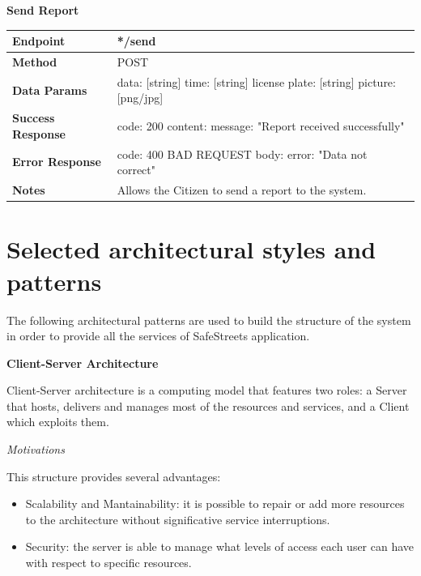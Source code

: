 \documentclass{report}
\begin{document}
\begin{center}{\textbf{Send Report}}\end{center}
    \begin{tabular}{| l | p{8cm} |}
        \hline
        \textbf{Endpoint} & */send \\
        \hline
        \textbf{Method} & POST \\
        \hline
        \textbf{Data Params} & data: [string] \newline time: [string] \newline license plate: [string] \newline picture: [png/jpg]\\
        \hline
        \textbf{Success Response} & code: 200 \newline content: {message: "Report received successfully"}\\
        \hline
        \textbf{Error Response} & code: 400 BAD REQUEST \newline body: {error: "Data not correct"}\\
        \hline
        \textbf{Notes} & Allows the Citizen to send a report to the system. \\
        \hline
    \end{tabular}


\section{Selected architectural	styles and patterns}
The following architectural patterns are used to build the structure of the system in order to provide all the services of SafeStreets application.\\

\begin{center}\large{\textbf{Client-Server Architecture}}\end{center}
Client-Server architecture is a computing model that features two roles: a Server that hosts, delivers and manages most of the resources and services, and a Client which exploits them.
\begin{center}\large{\textit{Motivations}}\end{center}
\noindent This structure provides several advantages:
\begin{itemize}
    \item Scalability and Mantainability: it is possible to repair or add more resources to the architecture without significative service interruptions.
    \item Security: the server is able to manage what levels of access each user can have with respect to specific resources.
\end{itemize}\vspace{2mm}
\end{document}
